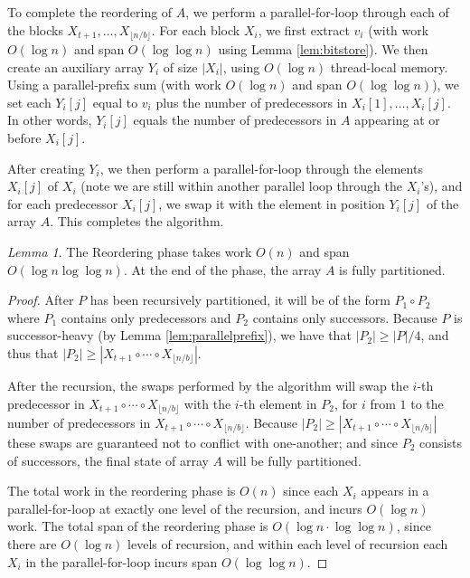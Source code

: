 \documentclass[sigplan, 10pt, nonacm]{acmart}
\theoremstyle{remark}
\newtheorem{lemma}[thm]{Lemma}
\theoremstyle{remark}
\begin{document}
To complete the reordering of $A$, we perform a parallel-for-loop
through each of the blocks $X_{t + 1}, \ldots, X_{\lfloor n / b \rfloor}$. For each block
$X_i$, we first extract $v_i$ (with work $O(\log n)$ and span $O(\log
\log n)$ using Lemma \ref{lem:bitstore}). We then create an auxiliary
array $Y_i$ of size $|X_i|$, using $O(\log n)$ thread-local
memory. Using a parallel-prefix sum (with work $O(\log n)$ and span
$O(\log \log n)$), we set each $Y_i[j]$ equal to $v_i$ plus the number
of predecessors in $X_i[1], \ldots, X_i[j]$. In other words, $Y_i[j]$
equals the number of predecessors in $A$ appearing at or before
$X_i[j]$.

After creating $Y_i$, we then perform a parallel-for-loop through the
elements $X_i[j]$ of $X_i$ (note we are still within another parallel
loop through the $X_i$'s), and for each predecessor $X_i[j]$, we swap
it with the element in position $Y_i[j]$ of the array $A$. This
completes the algorithm.

\begin{lemma}
 The Reordering phase takes work $O(n)$ and span $O(\log n \log \log
 n)$. At the end of the phase, the array $A$ is fully partitioned.
\end{lemma}
\begin{proof}
After $P$ has been recursively partitioned, it will be of the form
$P_1 \circ P_2$ where $P_1$ contains only predecessors and $P_2$
contains only successors. Because $P$ is successor-heavy (by Lemma
\ref{lem:parallelprefix}), we have that $|P_2| \ge |P| / 4$, and thus
that $|P_2| \ge |X_{t + 1} \circ \cdots \circ X_{\lfloor n / b
  \rfloor}|$.

After the recursion, the swaps performed by the algorithm will swap
the $i$-th predecessor in $X_{t + 1} \circ \cdots \circ X_{\lfloor n /
  b \rfloor}$ with the $i$-th element in $P_2$, for $i$ from $1$ to
the number of predecessors in $X_{t + 1} \circ \cdots \circ X_{\lfloor
  n / b \rfloor}$. Because $|P_2| \ge |X_{t + 1} \circ \cdots \circ
X_{\lfloor n / b \rfloor}|$ these swaps are guaranteed not to conflict
with one-another; and since $P_2$ consists of successors, the final
state of array $A$ will be fully partitioned.

The total work in the reordering phase is $O(n)$ since each $X_i$
appears in a parallel-for-loop at exactly one level of the recursion,
and incurs $O(\log n)$ work. The total span of the reordering phase is
$O(\log n \cdot \log \log n)$, since there are $O(\log n)$ levels of
recursion, and within each level of recursion each $X_i$ in the
parallel-for-loop incurs span $O(\log \log n)$. 
\end{proof}
\end{document}
